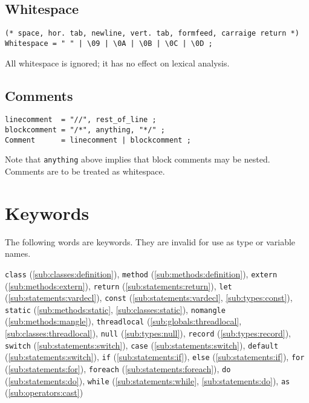 \documentclass{article}
\begin{document}
\subsection{Whitespace}
\label{sub:lexicals:whitespace}
\begin{verbatim}
(* space, hor. tab, newline, vert. tab, formfeed, carraige return *)
Whitespace = " " | \09 | \0A | \0B | \0C | \0D ;
\end{verbatim}
All whitespace is ignored; it has no effect on lexical analysis.

\subsection{Comments}
\label{sub:lexicals:comments}
\begin{verbatim}
linecomment  = "//", rest_of_line ;
blockcomment = "/*", anything, "*/" ;
Comment      = linecomment | blockcomment ;
\end{verbatim}
Note that \texttt{anything} above implies that block comments may be nested.
Comments are to be treated as whitespace.

\section{Keywords}
\label{sec:keywords}
The following words are keywords. They are invalid for use as type or variable
names.

\texttt{class} (\ref{sub:classes:definition}),
\texttt{method} (\ref{sub:methods:definition}),
\texttt{extern} (\ref{sub:methods:extern}),
\texttt{return} (\ref{sub:statements:return}),
\texttt{let} (\ref{sub:statements:vardecl}),
\texttt{const} (\ref{sub:statements:vardecl}, \ref{sub:types:const}),
\texttt{static} (\ref{sub:methods:static}, \ref{sub:classes:static}),
\texttt{nomangle} (\ref{sub:methods:mangle}),
\texttt{threadlocal} (\ref{sub:globals:threadlocal},
                      \ref{sub:classes:threadlocal}),
\texttt{null} (\ref{sub:types:null}),
\texttt{record} (\ref{sub:types:record}),
\texttt{switch} (\ref{sub:statements:switch}),
\texttt{case} (\ref{sub:statements:switch}),
\texttt{default} (\ref{sub:statements:switch}),
\texttt{if} (\ref{sub:statements:if}),
\texttt{else} (\ref{sub:statements:if}),
\texttt{for} (\ref{sub:statements:for}),
\texttt{foreach} (\ref{sub:statements:foreach}),
\texttt{do} (\ref{sub:statements:do}),
\texttt{while} (\ref{sub:statements:while}, \ref{sub:statements:do}),
\texttt{as} (\ref{sub:operators:cast})
\end{document}
